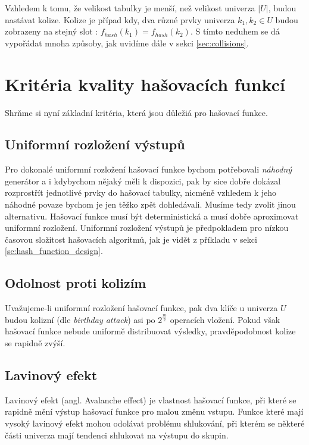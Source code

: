 Vzhledem k tomu, že velikost tabulky je menší, než velikost univerza $|U|$,
budou nastávat kolize. Kolize je případ kdy, dva různé prvky univerza
$k_{1}, k_{2} \in U$ budou zobrazeny na stejný slot : 
$f_{hash} (k_{1}) = f_{hash} (k_{2})$. S tímto neduhem se dá vypořádat mnoha 
způsoby, jak uvidíme dále v sekci \ref{sec:collisions}.

\section{Kritéria kvality hašovacích funkcí}

Shrňme si nyní základní kritéria, která jsou důležiá pro hašovací funkce.

\subsection{Uniformní rozložení výstupů}

Pro dokonalé uniformní rozložení hašovací funkce bychom potřebovali \textit{náhodný}
generátor a i kdybychom nějaký měli k dispozici, pak by sice dobře dokázal 
rozprostřít jednotlivé prvky do hašovací tabulky, nicméně vzhledem k jeho náhodné 
povaze bychom je jen těžko zpět dohledávali. Musíme tedy zvolit jinou 
alternativu. Hašovací funkce musí být deterministická a musí dobře aproximovat
uniformní rozložení. Uniformní rozložení výstupů je předpokladem pro
nízkou časovou složitost hašovacích algoritmů, jak je vidět z příkladu
v sekci \ref{se:hash_function_design}.

\subsection{Odolnost proti kolizím}

Uvažujeme-li uniformní rozložení hašovací funkce, pak dva klíče u univerza
$U$ budou kolizní (dle \textit{birthday attack}) asi po $2^{\frac{m}{2}}$ 
operacích vložení\cite{NCHF_auto_design}. Pokud však hašovací funkce nebude
uniformě distribuovat výsledky, pravděpodobnost kolize se rapidně zvýší.

\subsection{Lavinový efekt}

Lavinový efekt (angl. Avalanche effect) je vlastnost hašovací funkce, při
které se rapidně mění výstup hašovací funkce pro malou změnu vstupu. 
Funkce které mají vysoký lavinový efekt mohou odolávat problému shlukování,
při kterém se některé části univerza mají tendenci shlukovat na výstupu
do skupin.

